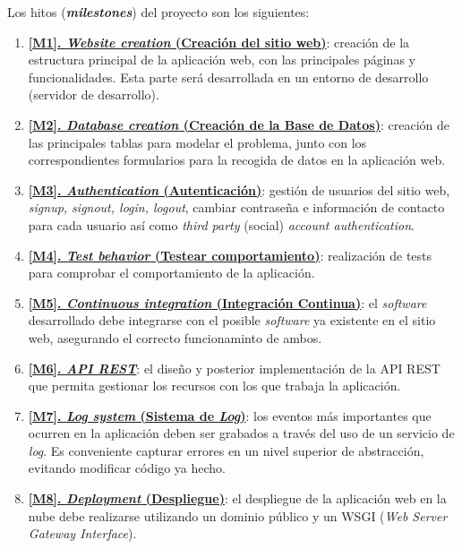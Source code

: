 Los hitos (\textbf{\textit{milestones}}) del proyecto son los siguientes:
\begin{enumerate}
    \item \textbf{\href{https://github.com/alexespana/TFG/milestone/1}{[M1].
    \textit{Website creation} (Creación del sitio web)}}: creación de la estructura
    principal de la aplicación web, con las principales páginas y funcionalidades. Esta
    parte será desarrollada en un entorno de desarrollo (servidor de desarrollo).
    \item \textbf{\href{https://github.com/alexespana/TFG/milestone/8}{[M2].
    \textit{Database creation} (Creación de la Base de Datos)}}: creación de las principales
    tablas para modelar el problema, junto con los correspondientes formularios para la
    recogida de datos en la aplicación web.
    \item \textbf{\href{https://github.com/alexespana/TFG/milestone/2}{[M3].
    \textit{Authentication} (Autenticación)}}: gestión de usuarios del sitio web,
    \textit{signup, signout, login, logout}, cambiar contraseña e información de contacto
    para cada usuario así como \textit{third party} (social) \textit{account authentication}. 
    \item \textbf{\href{https://github.com/alexespana/TFG/milestone/3}{[M4].
    \textit{Test behavior} (Testear comportamiento)}}: realización de tests para comprobar
    el comportamiento de la aplicación.
    \item \textbf{\href{https://github.com/alexespana/TFG/milestone/4}{[M5].
    \textit{Continuous integration} (Integración Continua)}}: el \textit{software}
    desarrollado debe integrarse con el posible \textit{software} ya existente en el sitio
    web, asegurando el correcto funcionaminto de ambos.
    \item \textbf{\href{https://github.com/alexespana/TFG/milestone/6}{[M6].
    \textit{API REST}}}: el diseño y posterior implementación de la API REST que permita
    gestionar los recursos con los que trabaja la aplicación.
    \item \textbf{\href{https://github.com/alexespana/TFG/milestone/5}{[M7].
    \textit{Log system} (Sistema de \textit{Log})}}: los eventos más importantes que
    ocurren en la aplicación deben ser grabados a través del uso de un servicio de
    \textit{log}. Es conveniente capturar errores en un nivel superior de abstracción,
    evitando modificar código ya hecho.
    \item \textbf{\href{https://github.com/alexespana/TFG/milestone/7}{[M8].
    \textit{Deployment} (Despliegue)}}: el despliegue de la aplicación web en la nube debe
    realizarse utilizando un dominio público y un WSGI (\textit{Web Server Gateway Interface}).
\end{enumerate}

